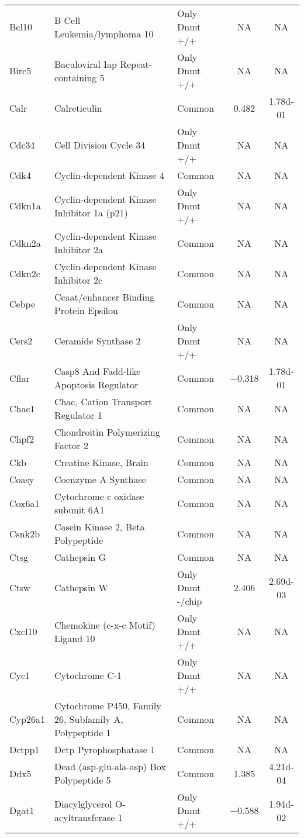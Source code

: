 {\begin{longtable}[l]{>{\raggedright}p{2.5cm}>{\raggedright}p{6cm}lcc}
Bcl10	& B Cell Leukemia/lymphoma 10	& Only Dnmt +/+	& NA	& NA\\ 
Birc5	& Baculoviral Iap Repeat-containing 5	& Only Dnmt +/+	& NA	& NA\\ 
Calr	& Calreticulin	& Common	& \num{ 0.482}	& \num{1.78d-01}\\ 
Cdc34	& Cell Division Cycle 34	& Only Dnmt +/+	& NA	& NA\\ 
Cdk4	& Cyclin-dependent Kinase 4	& Common	& NA	& NA\\ 
Cdkn1a	& Cyclin-dependent Kinase Inhibitor 1a (p21)	& Only Dnmt +/+	& NA	& NA\\ 
Cdkn2a	& Cyclin-dependent Kinase Inhibitor 2a	& Common	& NA	& NA\\ 
Cdkn2c	& Cyclin-dependent Kinase Inhibitor 2c & Common	& NA	& NA\\ 
Cebpe	& Ccaat/enhancer Binding Protein Epsilon	& Common	& NA	& NA\\ 
Cers2	& Ceramide Synthase 2	& Only Dnmt +/+	& NA	& NA\\ 
Cflar	& Casp8 And Fadd-like Apoptosis Regulator	& Common	& \num{-0.318}	& \num{1.78d-01}\\ 
Chac1	& Chac, Cation Transport Regulator 1	& Common	& NA	& NA\\ 
Chpf2	& Chondroitin Polymerizing Factor 2	& Common	& NA	& NA\\ 
Ckb	& Creatine Kinase, Brain	& Common	& NA	& NA\\ 
Coasy	& Coenzyme A Synthase	& Common	& NA	& NA\\ 
Cox6a1	& Cytochrome c oxidase subunit 6A1	& Common	& NA	& NA\\ 
Csnk2b	& Casein Kinase 2, Beta Polypeptide	& Common	& NA	& NA\\ 
Ctsg	& Cathepsin G	& Common	& NA	& NA\\ 
Ctsw	& Cathepsin W	& Only Dnmt -/chip	& \num{ 2.406}	& \num{2.69d-03}\\ 
Cxcl10	& Chemokine (c-x-c Motif) Ligand 10	& Only Dnmt +/+	& NA	& NA\\ 
Cyc1	& Cytochrome C-1	& Only Dnmt +/+	& NA	& NA\\ 
Cyp26a1	& Cytochrome P450, Family 26, Subfamily A, Polypeptide 1	& Common	& NA	& NA\\ 
Dctpp1	& Dctp Pyrophosphatase 1	& Common	& NA	& NA\\ 
Ddx5	& Dead (asp-glu-ala-asp) Box Polypeptide 5	& Common	& \num{ 1.385}	& \num{4.21d-04}\\ 
Dgat1	& Diacylglycerol O-acyltransferase 1	& Only Dnmt +/+	& \num{-0.588}	& \num{1.94d-02}\\ 

\end{longtable}}
